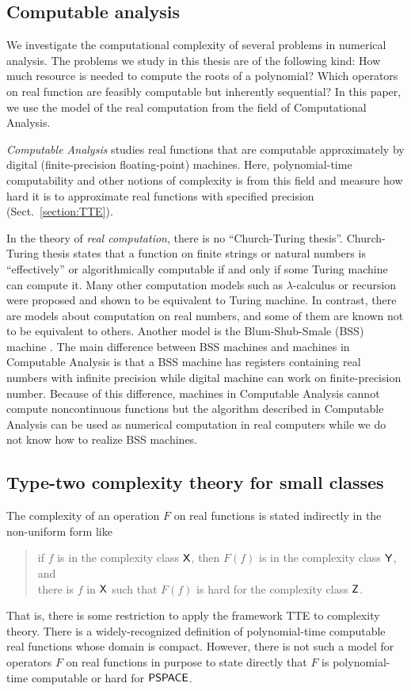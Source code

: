 \documentclass{article}
\theoremstyle{definition}
\theoremstyle{remark}
\begin{document}
\subsection{Computable analysis}

We investigate the computational complexity of several problems in 
numerical analysis.
The problems we study in this thesis are of the following kind:
How much resource is needed to compute the roots of a polynomial?
Which operators on real function are feasibly computable but inherently sequential?
In this paper, we use the model of the real computation from the field of 
Computational Analysis.

\emph{Computable Analysis} 
\cite{ko1991complexity,weihrauch00:_comput_analy}
studies real functions that are computable approximately 
by digital (finite-precision floating-point) machines.
Here, polynomial-time computability and other notions of complexity 
is from this field and measure how hard it is to approximate real functions
with specified precision  (Sect.~\ref{section:TTE}). 

In the theory of \emph{real computation}, 
there is no ``Church-Turing thesis''.
Church-Turing thesis states that a function on finite strings or natural 
numbers is ``effectively'' or algorithmically computable 
if and only if some Turing machine can compute it.
Many other computation models such as $\lambda$-calculus or recursion
were proposed and shown to be equivalent to Turing machine.
In contrast, there are models about computation on real numbers, 
and some of them are known not to be equivalent to others.
Another model is the Blum-Shub-Smale (BSS) machine \cite{blum1988theory}.
The main difference between BSS machines and machines in Computable Analysis is
that a BSS machine has registers containing real numbers with infinite precision
while digital machine can work on finite-precision number.
Because of this difference,
machines in Computable Analysis cannot compute noncontinuous functions
but the algorithm described in Computable Analysis 
can be used as numerical computation in real computers
 while we do not know
how to realize BSS machines.

\subsection{Type-two complexity theory for small classes}
The complexity of an operation $F$ on real functions
is stated indirectly in the non-uniform form like
\begin{quote}
 if $f$ is in the complexity class $\mathsf{X}$,
 then $F(f)$ is in the complexity class $\mathsf{Y}$, and \\
 there is $f$ in $\mathsf{X}$ such that $F(f)$ is hard for
 the complexity class $\mathsf{Z}$.
\end{quote}
That is, there is some restriction to apply the framework TTE
to complexity theory.
There is a widely-recognized definition of polynomial-time computable 
real functions whose domain is compact.
However, there is not such a model for
operators $F$ on real functions in purpose to state
directly that $F$ is polynomial-time computable or hard for $\mathsf{PSPACE}$.
\end{document}
